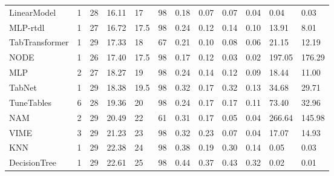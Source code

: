 \begin{tabular}{lllllrllllll}
LinearModel & 1 & 28 & 16.11 & 17 & 98 & 0.18 & 0.07 & 0.07 & 0.04 & 0.04 & 0.03 \\
MLP-rtdl & 1 & 27 & 16.72 & 17.5 & 98 & 0.24 & 0.12 & 0.14 & 0.10 & 13.91 & 8.01 \\
TabTransformer & 1 & 29 & 17.33 & 18 & 67 & 0.21 & 0.10 & 0.08 & 0.06 & 21.15 & 12.19 \\
NODE & 1 & 26 & 17.40 & 17.5 & 98 & 0.17 & 0.12 & 0.03 & 0.02 & 197.05 & 176.29 \\
MLP & 2 & 27 & 18.27 & 19 & 98 & 0.24 & 0.14 & 0.12 & 0.09 & 18.44 & 11.00 \\
TabNet & 1 & 29 & 18.38 & 19.5 & 98 & 0.32 & 0.17 & 0.32 & 0.13 & 34.68 & 29.71 \\
TuneTables & 6 & 28 & 19.36 & 20 & 98 & 0.24 & 0.17 & 0.17 & 0.11 & 73.40 & 32.96 \\
NAM & 2 & 29 & 20.49 & 22 & 61 & 0.31 & 0.17 & 0.05 & 0.04 & 266.64 & 145.98 \\
VIME & 3 & 29 & 21.23 & 23 & 98 & 0.32 & 0.23 & 0.07 & 0.04 & 17.07 & 14.93 \\
KNN & 1 & 29 & 22.38 & 24 & 98 & 0.38 & 0.19 & 0.30 & 0.14 & 0.05 & 0.03 \\
DecisionTree & 1 & 29 & 22.61 & 25 & 98 & 0.44 & 0.37 & 0.43 & 0.32 & 0.02 & 0.01 \\
\bottomrule
\end{tabular}
